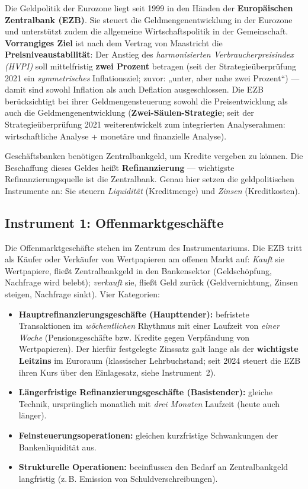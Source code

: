 \documentclass[11pt, a4paper]{article}
\begin{document}
Die Geldpolitik der Eurozone liegt seit 1999 in den Händen der \textbf{Europäischen
Zentralbank (EZB)}. Sie steuert die Geldmengenentwicklung in der Eurozone und unterstützt
zudem die allgemeine Wirtschaftspolitik in der Gemeinschaft. \textbf{Vorrangiges Ziel}
ist nach dem Vertrag von Maastricht die \textbf{Preisniveaustabilität}: Der Anstieg des
\emph{harmonisierten Verbraucherpreisindex (HVPI)} soll mittelfristig \textbf{zwei
Prozent} betragen (seit der Strategieüberprüfung 2021 ein \emph{symmetrisches}
Inflationsziel; zuvor: „unter, aber nahe zwei Prozent``) --- damit sind sowohl Inflation
als auch Deflation ausgeschlossen. Die EZB
berücksichtigt bei ihrer Geldmengensteuerung sowohl die Preisentwicklung als auch die
Geldmengenentwicklung (\textbf{Zwei-Säulen-Strategie}; seit der Strategieüberprüfung 2021
weiterentwickelt zum integrierten Analyserahmen: wirtschaftliche Analyse + monetäre und
finanzielle Analyse).

\begin{merksatz}
Geschäftsbanken benötigen Zentralbankgeld, um Kredite vergeben zu können. Die Beschaffung
dieses Geldes heißt \textbf{Refinanzierung} --- wichtigste Refinanzierungsquelle ist die
Zentralbank. Genau hier setzen die geldpolitischen Instrumente an: Sie steuern
\emph{Liquidität} (Kreditmenge) und \emph{Zinsen} (Kreditkosten).
\end{merksatz}

\subsection{Instrument 1: Offenmarktgeschäfte}

Die Offenmarktgeschäfte stehen im Zentrum des Instrumentariums. Die EZB tritt als Käufer
oder Verkäufer von Wertpapieren am offenen Markt auf: \emph{Kauft} sie Wertpapiere, fließt
Zentralbankgeld in den Bankensektor (Geldschöpfung, Nachfrage wird belebt); \emph{verkauft}
sie, fließt Geld zurück (Geldvernichtung, Zinsen steigen, Nachfrage sinkt). Vier Kategorien:

\begin{itemize}
  \item \textbf{Hauptrefinanzierungsgeschäfte (Haupttender):} befristete Transaktionen im
    \emph{wöchentlichen} Rhythmus mit einer Laufzeit von \emph{einer Woche}
    (Pensionsgeschäfte bzw. Kredite gegen Verpfändung von Wertpapieren). Der hierfür
    festgelegte Zinssatz galt lange als der \textbf{wichtigste Leitzins} im Euroraum
    (klassischer Lehrbuchstand; seit 2024 steuert die EZB ihren Kurs über den
    Einlagesatz, siehe Instrument~2).
  \item \textbf{Längerfristige Refinanzierungsgeschäfte (Basistender):} gleiche Technik,
    ursprünglich monatlich mit \emph{drei Monaten} Laufzeit (heute auch länger).
  \item \textbf{Feinsteuerungsoperationen:} gleichen kurzfristige Schwankungen der
    Bankenliquidität aus.
  \item \textbf{Strukturelle Operationen:} beeinflussen den Bedarf an Zentralbankgeld
    langfristig (z.\,B. Emission von Schuldverschreibungen).
\end{itemize}
\end{document}
